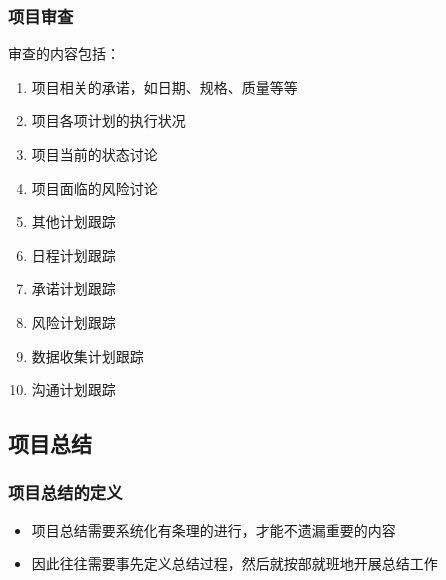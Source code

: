 \subsubsection{项目审查}
审查的内容包括：
\vspace{-0.8em}
\begin{multicols}{3}
    \begin{enumerate}[label=\arabic*.]
        \item 项目相关的承诺，如日期、规格、质量等等
        \item 项目各项计划的执行状况
        \item 项目当前的状态讨论
        \item 项目面临的风险讨论
        \item 其他计划跟踪
        \item 日程计划跟踪
        \item 承诺计划跟踪
        \item 风险计划跟踪
        \item 数据收集计划跟踪
        \item 沟通计划跟踪
    \end{enumerate}
\end{multicols}
\vspace{-1em}

\subsection{项目总结}
\subsubsection{项目总结的定义}
\begin{itemize}
    \item 项目总结需要系统化有条理的进行，才能不遗漏重要的内容
    \item 因此往往需要事先定义总结过程，然后就按部就班地开展总结工作
\end{itemize}

